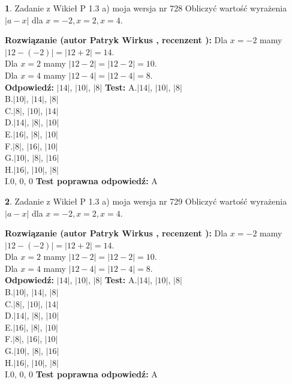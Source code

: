\documentclass[12pt, a4paper]{article}
\theoremstyle{definition} %
\newtheorem{zad}{}
\newcommand{\zadStart}[1]{\begin{zad}#1\newline}
\newcommand{\zadStop}{\end{zad}}
\newcommand{\rozwStart}[2]{\noindent \textbf{Rozwiązanie (autor #1 , recenzent #2): }\newline}
\newcommand{\rozwStop}{\newline}
\newcommand{\odpStart}{\noindent \textbf{Odpowiedź:}\newline}
\newcommand{\odpStop}{\newline}
\newcommand{\testStart}{\noindent \textbf{Test:}\newline}
\newcommand{\testStop}{\newline}
\newcommand{\kluczStart}{\noindent \textbf{Test poprawna odpowiedź:}\newline}
\newcommand{\kluczStop}{\newline}
\begin{document}
\zadStart{Zadanie z Wikieł P 1.3 a) moja wersja nr 728}
Obliczyć wartość wyrażenia $|a - x|$ dla $x=-2,x=2,x=4$.
\zadStop
\rozwStart{Patryk Wirkus}{}
Dla $x = -2$ mamy $|12 - (-2)| = |12 + 2| = 14$.\\
Dla $x = 2$ mamy $|12 - 2| = |12 - 2| = 10$.\\
Dla $x = 4$ mamy $|12 - 4| = |12 - 4| = 8$.\\
\rozwStop
\odpStart
$|14|$, $|10|$, $|8|$
\odpStop
\testStart
A.$|14|$, $|10|$, $|8|$\\
B.$|10|$, $|14|$, $|8|$\\
C.$|8|$, $|10|$, $|14|$\\
D.$|14|$, $|8|$, $|10|$\\
E.$|16|$, $|8|$, $|10|$\\
F.$|8|$, $|16|$, $|10|$\\
G.$|10|$, $|8|$, $|16|$\\
H.$|16|$, $|10|$, $|8|$\\
I.$0$, $0$, $0$
\testStop
\kluczStart
A
\kluczStop



\zadStart{Zadanie z Wikieł P 1.3 a) moja wersja nr 729}
Obliczyć wartość wyrażenia $|a - x|$ dla $x=-2,x=2,x=4$.
\zadStop
\rozwStart{Patryk Wirkus}{}
Dla $x = -2$ mamy $|12 - (-2)| = |12 + 2| = 14$.\\
Dla $x = 2$ mamy $|12 - 2| = |12 - 2| = 10$.\\
Dla $x = 4$ mamy $|12 - 4| = |12 - 4| = 8$.\\
\rozwStop
\odpStart
$|14|$, $|10|$, $|8|$
\odpStop
\testStart
A.$|14|$, $|10|$, $|8|$\\
B.$|10|$, $|14|$, $|8|$\\
C.$|8|$, $|10|$, $|14|$\\
D.$|14|$, $|8|$, $|10|$\\
E.$|16|$, $|8|$, $|10|$\\
F.$|8|$, $|16|$, $|10|$\\
G.$|10|$, $|8|$, $|16|$\\
H.$|16|$, $|10|$, $|8|$\\
I.$0$, $0$, $0$
\testStop
\kluczStart
A
\kluczStop
\end{document}
